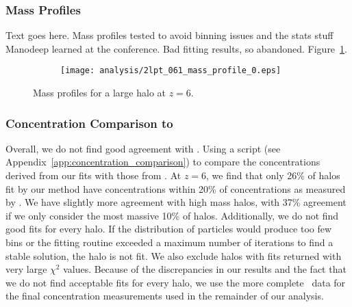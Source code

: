\subsubsection{Mass Profiles}
\label{subsubsec:analysis--profile_fitting--mass_profiles}


Text goes here.  Mass profiles tested to avoid binning issues and the stats stuff Manodeep learned at the conference.  Bad fitting results, so abandoned.  Figure~\ref{fig:mass_profile}.

\begin{figure}[t]
	\centering
	\begin{subfigure}{}
		\texttt{[image: analysis/2lpt\_061\_mass\_profile\_0.eps]}
	\end{subfigure}
	\caption[Mass profiles a large halo at $z = 6$.]{\footnotesize Mass profiles for a large halo at $z = 6$.  }
	\label{fig:mass_profile}
\end{figure}



\subsubsection{Concentration Comparison to \rockstar}
\label{subsubsec:analysis--profile_fitting--rockstar_comparison}


Overall, we do not find good agreement with \rockstar.  Using a script (see Appendix~\ref{app:concentration_comparison}) to compare the concentrations derived from our fits with those from \rockstar.  At $z = 6$, we find that only 26\% of halos fit by our method have concentrations within 20\% of concentrations as measured by \rockstar.  We have slightly more agreement with high mass halos, with 37\% agreement if we only consider the most massive 10\% of halos.  Additionally, we do not find good fits for every halo.  If the distribution of particles would produce too few bins or the fitting routine exceeded a maximum number of iterations to find a stable solution, the halo is not fit.  We also exclude halos with fits returned with very large $\chi^{2}$ values.  Because of the discrepancies in our results and the fact that we do not find acceptable fits for every halo, we use the more complete \rockstar\ data for the final concentration measurements used in the remainder of our analysis.




